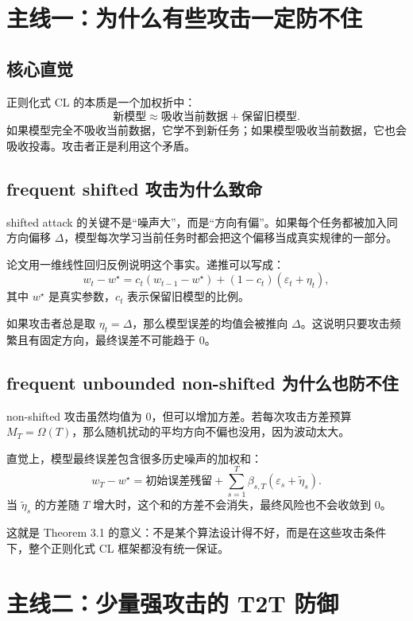 \documentclass[UTF8,fontset=none,11pt]{ctexart}
\begin{document}
\section{主线一：为什么有些攻击一定防不住}

\subsection{核心直觉}

正则化式 CL 的本质是一个加权折中：
\[
  \text{新模型}
  \approx
  \text{吸收当前数据}
  +
  \text{保留旧模型}.
\]
如果模型完全不吸收当前数据，它学不到新任务；如果模型吸收当前数据，它也会吸收投毒。攻击者正是利用这个矛盾。

\subsection{frequent shifted 攻击为什么致命}

shifted attack 的关键不是“噪声大”，而是“方向有偏”。如果每个任务都被加入同方向偏移 \(\Delta\)，模型每次学习当前任务时都会把这个偏移当成真实规律的一部分。

论文用一维线性回归反例说明这个事实。递推可以写成：
\[
  w_t-w^\star
  =
  c_t(w_{t-1}-w^\star)
  +(1-c_t)(\varepsilon_t+\eta_t),
\]
其中 \(w^\star\) 是真实参数，\(c_t\) 表示保留旧模型的比例。

如果攻击者总是取 \(\eta_t=\Delta\)，那么模型误差的均值会被推向 \(\Delta\)。这说明只要攻击频繁且有固定方向，最终误差不可能趋于 0。

\subsection{frequent unbounded non-shifted 为什么也防不住}

non-shifted 攻击虽然均值为 0，但可以增加方差。若每次攻击方差预算 \(M_T=\Omega(T)\)，那么随机扰动的平均方向不偏也没用，因为波动太大。

直觉上，模型最终误差包含很多历史噪声的加权和：
\[
  w_T-w^\star
  =
  \text{初始误差残留}
  +
  \sum_{s=1}^T \beta_{s,T}(\varepsilon_s+\tilde\eta_s).
\]
当 \(\tilde\eta_s\) 的方差随 \(T\) 增大时，这个和的方差不会消失，最终风险也不会收敛到 0。

这就是 Theorem 3.1 的意义：不是某个算法设计得不好，而是在这些攻击条件下，整个正则化式 CL 框架都没有统一保证。

\section{主线二：少量强攻击的 T2T 防御}
\end{document}
